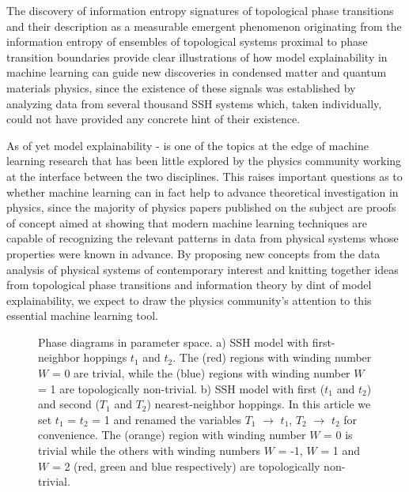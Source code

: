\documentclass[10pt]{revtex4-1}
\newcommand\SSHOnePhaseDiagram{./ssh1_phase_diagram.png}
\newcommand\SSHTwoPhaseDiagram{./ssh2_phase_diagram.png}
\begin{document}
The  discovery of information entropy signatures of topological phase transitions and their description as a measurable emergent phenomenon originating from the information entropy of ensembles of topological systems proximal to phase transition boundaries provide clear illustrations of how model explainability in machine learning can guide new discoveries in condensed matter and quantum materials physics, since the existence of these signals was established by analyzing data from several thousand SSH systems which, taken individually, could not have provided any concrete hint of their existence.%

As of yet model explainability \cite{gilpin2018explaining}-\cite{roscher2020explainable} is one of the topics at the edge of machine learning research that has been little explored by the physics community working at the interface between the two disciplines. This raises important questions as to whether machine learning can in fact help to advance theoretical investigation in physics, since the majority of physics papers published on the subject are proofs of concept aimed at showing that modern machine learning techniques are capable of recognizing the relevant patterns in data from physical systems whose properties were known in advance. By proposing new concepts from the data analysis of physical systems of contemporary interest and knitting together ideas from topological phase transitions and information theory by dint of model explainability, we expect to draw the physics community's attention to this essential machine learning tool. 
\begin{figure}
\centering
{}\quad
{}
\caption{Phase diagrams in parameter space. a) SSH model with first-neighbor hoppings $t_1$ and $t_2$. The (red) regions with winding number $W$ = 0 are trivial, while the (blue) regions with winding number $W$ = 1 are topologically non-trivial. b) SSH model with first ($t_1$ and $t_2$) and second ($T_1$ and $T_2$) nearest-neighbor hoppings. In this article we set $t_1$ = $t_2$ = 1 and renamed the variables $T_1$ $\rightarrow$ $t_1$, $T_2$ $\rightarrow$ $t_2$ for convenience. The (orange) region with winding number $W$ = 0 is trivial while the others with winding numbers $W$ = -1, $W$ = 1 and $W$ = 2 (red, green and blue respectively) are topologically non-trivial.}
\label{fig:phasediagrams}
\end{figure}
\end{document}
